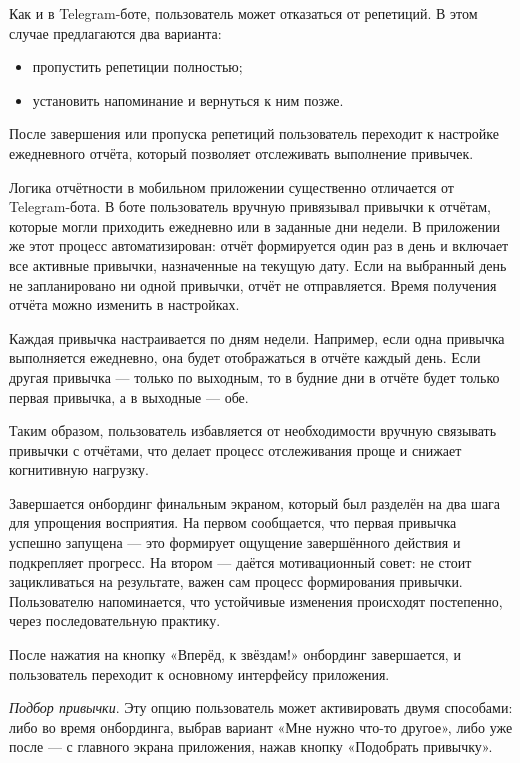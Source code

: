 \documentclass[pdflatex,sn-mathphys-num]{sn-jnl}%
\theoremstyle{thmstyleone}%
\theoremstyle{thmstyletwo}%
\theoremstyle{thmstylethree}%
\begin{document}
Как и в Telegram-боте, пользователь может отказаться от репетиций. В этом случае предлагаются два варианта:

\begin{itemize}
\item пропустить репетиции полностью;
\item установить напоминание и вернуться к ним позже.
\end{itemize}

После завершения или пропуска репетиций пользователь переходит к настройке ежедневного отчёта, который позволяет отслеживать выполнение привычек.

Логика отчётности в мобильном приложении существенно отличается от Telegram-бота. В боте пользователь вручную привязывал привычки к отчётам, которые могли приходить ежедневно или в заданные дни недели. В приложении же этот процесс автоматизирован: отчёт формируется один раз в день и включает все активные привычки, назначенные на текущую дату. Если на выбранный день не запланировано ни одной привычки, отчёт не отправляется. Время получения отчёта можно изменить в настройках.

Каждая привычка настраивается по дням недели. Например, если одна привычка выполняется ежедневно, она будет отображаться в отчёте каждый день. Если другая привычка — только по выходным, то в будние дни в отчёте будет только первая привычка, а в выходные — обе.

Таким образом, пользователь избавляется от необходимости вручную связывать привычки с отчётами, что делает процесс отслеживания проще и снижает когнитивную нагрузку.

Завершается онбординг финальным экраном, который был разделён на два шага для упрощения восприятия. На первом сообщается, что первая привычка успешно запущена — это формирует ощущение завершённого действия и подкрепляет прогресс. На втором — даётся мотивационный совет: не стоит зацикливаться на результате, важен сам процесс формирования привычки. Пользователю напоминается, что устойчивые изменения происходят постепенно, через последовательную практику.

После нажатия на кнопку «Вперёд, к звёздам!» онбординг завершается, и пользователь переходит к основному интерфейсу приложения.

\textit{Подбор привычки}. Эту опцию пользователь может активировать двумя способами: либо во время онбординга, выбрав вариант «Мне нужно что-то другое», либо уже после — с главного экрана приложения, нажав кнопку «Подобрать привычку».
\end{document}

